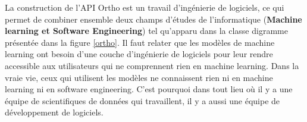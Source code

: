 \documentclass[12pt, french]{report}
\begin{document}
%
%

La construction de l'API Ortho est un travail d'ingénierie de logiciels, ce qui permet de combiner ensemble deux champs d'études de l'informatique (\textbf{Machine learning et Software Engineering}) tel qu'apparu dans la classe digramme présentée dans la figure \ref{ortho}. Il faut relater que les modèles de machine learning ont besoin d'une couche d'ingénierie de logiciels pour leur rendre accessible aux utilisateurs qui ne comprennent rien en machine learning. Dans la vraie vie, ceux qui utilisent les modèles ne connaissent rien ni en machine learning ni en software engineering. C'est pourquoi dans tout lieu où il y a une équipe de scientifiques de données qui travaillent, il y a aussi une équipe de développement de logiciels.
\end{document}
